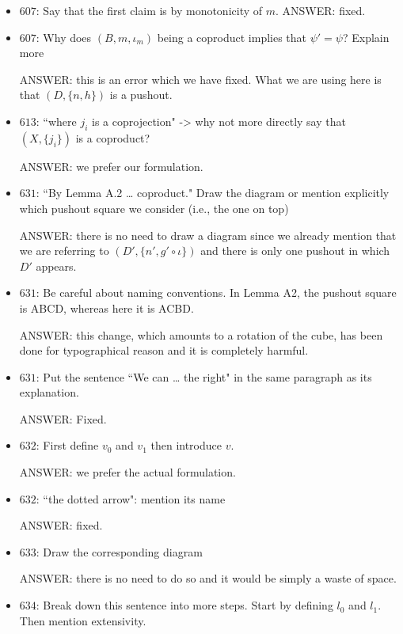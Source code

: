 \documentclass[english,11pt,a4paper]{article}
\begin{document}
\begin{itemize}
\item $607$: Say that the first claim is by monotonicity of $m$.
ANSWER: fixed.

\item $607$: Why does $(B,{m,\iota_m})$ being a coproduct implies that $\psi' = \psi$? Explain more

ANSWER: this is an error which we have fixed. What we are using here is that $(D, \{n, h\})$ is a pushout.


\item $613$: ``where $j_i$ is a coprojection" -> why not more directly say that $(X, \{j_i\})$ is a coproduct?

ANSWER: we prefer our formulation.

\item $631$: ``By Lemma A.2 … coproduct." Draw the diagram or mention explicitly which pushout square we consider (i.e., the one on top)

ANSWER: there is no need to draw a diagram since we already mention that we are referring to $(D', \{n', g'\circ \iota\})$ and there is only one pushout in which $D'$ appears.

\item $631$: Be careful about naming conventions. In Lemma A2, the pushout square is ABCD, whereas here it is ACBD.

ANSWER: this change, which amounts to a rotation of the cube, has been done for typographical reason and it is completely harmful.


\item $631$: Put the sentence ``We can … the right" in the same paragraph as its explanation.

ANSWER: Fixed.

\item $632$: First define $v_0$ and $v_1$ then introduce $v$.

ANSWER: we prefer the actual formulation.

\item $632$: ``the dotted arrow": mention its name

ANSWER: fixed.

\item $633$: Draw the corresponding diagram

ANSWER: there is no need to do so and it would be simply a waste of space.


\item $634$: Break down this sentence into more steps. Start by defining $l_0$ and $l_1$. Then mention extensivity.


\end{itemize}
\end{document}
